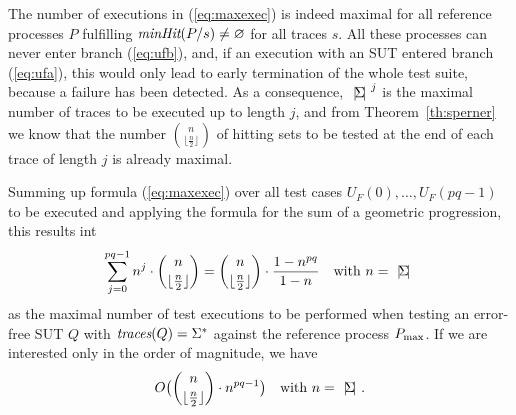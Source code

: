 The number of executions in (\ref{eq:maxexec}) is indeed maximal for all
reference processes $P$ fulfilling $\text{\it minHit}(P/s)\neq\varnothing$ for all
traces $s$. All these processes can never enter branch (\ref{eq:ufb}), and,
if an execution with an SUT entered branch (\ref{eq:ufa}), this would only
lead to early termination of the whole test suite, because a failure has been
detected. As a consequence, ${~|\! \Sigma\!|~}^{j}$ is the maximal number of
traces to be executed up to length $j$, and from Theorem~\ref{th:sperner} we
know that the number $\binom{n}{\lfloor\frac{n}{2}\rfloor}$ of hitting sets
to be tested at the end of each trace of length $j$ is already maximal.

Summing up  formula (\ref{eq:maxexec}) over all test cases
$U_F(0),\dots,U_F(pq-1)$ to be executed and applying the formula for the sum
of a geometric progression,  this results int
%
\begin{equation}\label{eq:pmaxcomplexity}
\sum_{j=0}^{pq-1} n^{j}\cdot \binom{n}{\lfloor\frac{n}{2}\rfloor}  =
\binom{n}{\lfloor\frac{n}{2}\rfloor}\cdot\frac{1-n^{pq}}{1-n}\quad\text{with $n={~|\! \Sigma\!|~}$}
\end{equation}
%
as the maximal number of test executions to be performed when testing an
error-free SUT $Q$ with $\text{\it traces}(Q) = \Sigma^*$ against the reference process
$P_\text{max}$. If we are interested only in the order of magnitude, we have
%
\begin{equation}
\label{eq:maxO}
O\big(\binom{n}{\lfloor\frac{n}{2}\rfloor}\cdot n^{pq-1}\big)\quad\text{with $n={~|\! \Sigma\!|~}$}.
\end{equation}

